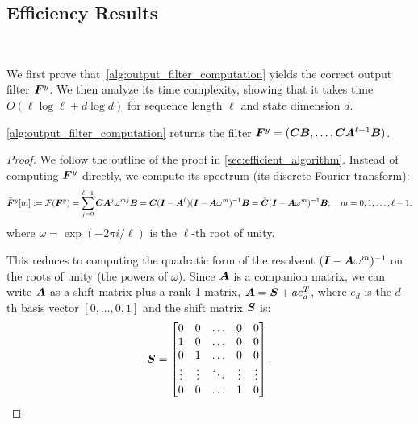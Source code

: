 \subsection{Efficiency Results}~\label{appendix:efficiency_proofs}


We first prove that~\cref{alg:output_filter_computation} yields the correct
output filter $\boldsymbol{F}^y$.
We then analyze its time complexity, showing that it takes time
$O(\ell \log \ell + d \log d)$ for sequence length $\ell$ and state dimension $d$.

\begin{theorem}
  \cref{alg:output_filter_computation} returns the filter $\boldsymbol{F}^y = (\boldsymbol{C} \boldsymbol{B}, \dots, \boldsymbol{C}\boldsymbol{A}^{\ell-1}\boldsymbol{B})$.
\end{theorem}

\begin{proof}
  We follow the outline of the proof in \cref{sec:efficient_algorithm}.
  Instead of computing $\boldsymbol{F}^y$ directly, we compute its spectrum (its discrete Fourier transform):
\begin{equation*}
  \tilde{\boldsymbol{F}}^y[m] := {\cal F}(\boldsymbol{F}^y) = \sum_{j=0}^{\ell-1} \boldsymbol{C} \boldsymbol{A}^j \omega^{mj} \boldsymbol{B} = \boldsymbol{C}(\boldsymbol{I} - \boldsymbol{A}^\ell) (\boldsymbol{I} - \boldsymbol{A} \omega^m)^{-1} \boldsymbol{B} = \tilde{\boldsymbol{C}} (\boldsymbol{I} - \boldsymbol{A} \omega^m)^{-1} \boldsymbol{B},
  \quad m = 0, 1, \dots, \ell-1.
\end{equation*}
where $\omega = \exp(-2\pi i / \ell)$ is the $\ell$-th root of unity.

This reduces to computing the quadratic form of the resolvent $(\boldsymbol{I} - \boldsymbol{A} \omega^m)^{-1}$
on the roots of unity (the powers of $\omega$).
Since $\boldsymbol{A}$ is a companion matrix, we can write $\boldsymbol{A}$ as a shift matrix plus a
rank-1 matrix, $\boldsymbol{A} = \boldsymbol{S} + a e_d^T$, where $e_d$ is the $d$-th basis vector
$[0, \dots, 0, 1]$ and the shift matrix $\boldsymbol{S}$ is:
\begin{equation*}
  \boldsymbol{S} = \begin{bmatrix}
    0 & 0 & \dots & 0 & 0 \\
    1 & 0 & \dots & 0 & 0 \\
    0 & 1 & \dots & 0 & 0 \\
    \vdots & \vdots & \ddots & \vdots & \vdots \\
    0 & 0 & \dots & 1 & 0 \\
  \end{bmatrix}.
\end{equation*}



\end{proof}
